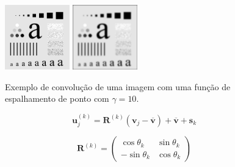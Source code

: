 \documentclass[12pt,openright,oneside,a4paper,english,brazil]{abntex2}
\begin{document}
\begin{figure}
	\centering
	\includegraphics[width = 0.25\textwidth]{./figures/psfexample0.png}
	\includegraphics[width = 0.25\textwidth]{./figures/psfexample1.png}
	\caption{Exemplo de convolução de uma imagem com uma função de espalhamento de ponto com $\gamma = 10$.}
	\label{fig:psfexample}
\end{figure}

\begin{equation}
	\label{eq:psfcenter}
	\mathbf{u}^{(k)}_j = \mathbf{R}^{(k)}(\mathbf{v}_j-\mathbf{\overline{v}})+\mathbf{\overline{v}}+\mathbf{s}_k
\end{equation}

\begin{equation}
	\mathbf{R}^{(k)} = 
	\begin{pmatrix}
		\cos \theta_k & \sin \theta_k \\
		- \sin \theta_k & \cos \theta_k
	\end{pmatrix}
\end{equation}
\end{document}
